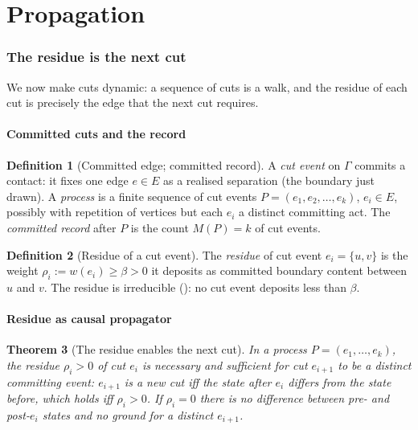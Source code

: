 \documentclass[11pt,twocolumn,a4paper]{article}
\theoremstyle{thmstyle}
\newtheorem{theorem}{Theorem}[section]
\theoremstyle{definition}
\newtheorem{definition}[theorem]{Definition}
\theoremstyle{remark}
\newcommand{\Gph}{\Gamma}
\newcommand{\E}{E}
\newcommand{\wt}{w}
\newcommand{\flo}{\beta}                 %
\newcommand{\rec}{M}                     %
\newcommand{\res}{\rho}                  %
\begin{document}
\part{Propagation}

\section{The residue is the next cut}
\label{sec:residue}

We now make cuts dynamic: a sequence of cuts is a walk, and the residue of
each cut is precisely the edge that the next cut requires.

\subsection{Committed cuts and the record}

\begin{definition}[Committed edge; committed record]
\label{def:committed}
A \emph{cut event} on $\Gph$ commits a contact: it fixes one edge
$e\in\E$ as a realised separation (the boundary just drawn). A
\emph{process} is a finite sequence of cut events
$P=(e_1,e_2,\dots,e_k)$, $e_i\in\E$, possibly with repetition of vertices
but each $e_i$ a distinct committing act. The \emph{committed record}
after $P$ is the count $\rec(P)=k$ of cut events.
\end{definition}

\begin{definition}[Residue of a cut event]
\label{def:residue}
The \emph{residue} of cut event $e_i=\{u,v\}$ is the weight
$\res_i:=\wt(e_i)\ge\flo>0$ it deposits as committed boundary content
between $u$ and $v$. The residue is irreducible (): no cut
event deposits less than $\flo$.
\end{definition}

\subsection{Residue as causal propagator}

\begin{theorem}[The residue enables the next cut]
\label{thm:propagator}
In a process $P=(e_1,\dots,e_k)$, the residue $\res_i>0$ of cut $e_i$ is
necessary and sufficient for cut $e_{i+1}$ to be a distinct committing
event: $e_{i+1}$ is a new cut iff the state after $e_i$ differs from the
state before, which holds iff $\res_i>0$. If $\res_i=0$ there is no
difference between pre- and post-$e_i$ states and no ground for a distinct
$e_{i+1}$.
\end{theorem}
\end{document}
